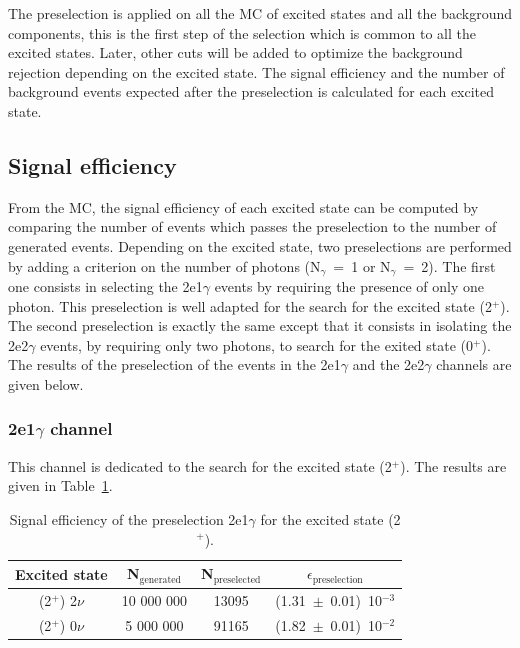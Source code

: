 \documentclass[main.tex]{subfiles}
\begin{document}
\bigskip


\NI The preselection is applied on all the MC of excited states and all the background components, this is the first step of the selection which is common to all the excited states. Later, other cuts will be added to optimize the background rejection depending on the excited state. The signal efficiency and the number of background events expected after the preselection is calculated for each excited state.


\subsection{Signal efficiency}

 
\NI From the MC, the signal efficiency of each excited state can be computed by comparing the number of events which passes the preselection to the number of generated events. Depending on the excited state, two preselections are performed by adding a criterion on the number of photons (N$_{\gamma}$~=~1 or N$_{\gamma}$~=~2). The first one consists in selecting the 2e1$\gamma$ events by requiring the presence of only one photon. This preselection is well adapted for the search for the excited state (2$^+$). The second preselection is exactly the same except that it consists in isolating the 2e2$\gamma$ events, by requiring only two photons, to search for the exited state (0$^+$). The results of the preselection of the events in the 2e1$\gamma$ and the 2e2$\gamma$ channels are given below. 


\subsubsection{2e1$\gamma$ channel}


\NI This channel is dedicated to the search for the excited state (2$^+$). The results are given in Table~\ref{EffPreselection2PLUS}.


\begin{table}[h!]
\begin{center}
\begin{tabular}{c|c|c|c}
\toprule
Excited state & N$_\text{{generated}}$ & N$_\text{{preselected}}$ & $\epsilon_\text{{preselection}}$ \\[0.1cm]
\midrule
(2$^+$) 2$\nu$ &  10 000 000 & 13095 & (1.31~$\pm$~0.01)~10$^{-\text{3}}$\\[0.1cm]
(2$^+$) 0$\nu$ &   5 000 000 & 91165 & (1.82~$\pm$~0.01)~10$^{-\text{2}}$\\[0.1cm]
\bottomrule
\end{tabular}
\caption{Signal efficiency of the preselection 2e1$\gamma$ for the excited state (2$^+$).}
\label{EffPreselection2PLUS}
\end{center}
\end{table}
\end{document}
